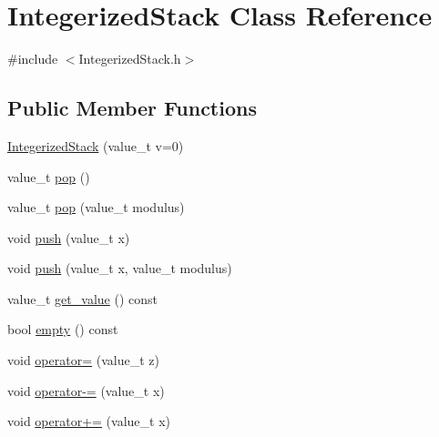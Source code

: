 \hypertarget{class_integerized_stack}{}\section{Integerized\+Stack Class Reference}
\label{class_integerized_stack}


{\ttfamily \#include $<$Integerized\+Stack.\+h$>$}

\subsection*{Public Member Functions}
\begin{DoxyCompactItemize}
\item 
\hyperlink{class_integerized_stack_a46b24ace7ea983bfabaa437932111440}{Integerized\+Stack} (value\+\_\+t v=0)
\item 
value\+\_\+t \hyperlink{class_integerized_stack_a5edd593c74341341cc6f8e41e0f14bdf}{pop} ()
\item 
value\+\_\+t \hyperlink{class_integerized_stack_a713da8c8102cb5a53ec3ad87fada36f5}{pop} (value\+\_\+t modulus)
\item 
void \hyperlink{class_integerized_stack_a721481e52e56398bee39edf6a3d2ff80}{push} (value\+\_\+t x)
\item 
void \hyperlink{class_integerized_stack_affd28eb928362de80e35cd4e1ecdf96b}{push} (value\+\_\+t x, value\+\_\+t modulus)
\item 
value\+\_\+t \hyperlink{class_integerized_stack_aedecc57b1bbb2c056f57a00ec6eea2e3}{get\+\_\+value} () const
\item 
bool \hyperlink{class_integerized_stack_a549d4ed66e89d2e3d7e726d5c8e28fa2}{empty} () const
\item 
void \hyperlink{class_integerized_stack_a829e18dc8bae3eb371e9822271102a2d}{operator=} (value\+\_\+t z)
\item 
void \hyperlink{class_integerized_stack_ac2ec311399b327573a2c0f19d2a902a4}{operator-\/=} (value\+\_\+t x)
\item 
void \hyperlink{class_integerized_stack_a70df05b936e94c717584290d0c457cca}{operator+=} (value\+\_\+t x)
\end{DoxyCompactItemize}
